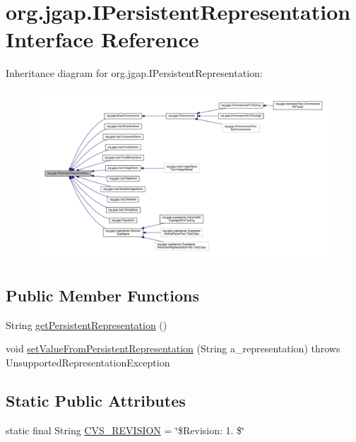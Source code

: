 \hypertarget{interfaceorg_1_1jgap_1_1_i_persistent_representation}{\section{org.\-jgap.\-I\-Persistent\-Representation Interface Reference}
\label{interfaceorg_1_1jgap_1_1_i_persistent_representation}
}


Inheritance diagram for org.\-jgap.\-I\-Persistent\-Representation\-:
\nopagebreak
\begin{figure}[H]
\begin{center}
\leavevmode
\includegraphics[width=350pt]{interfaceorg_1_1jgap_1_1_i_persistent_representation__inherit__graph}
\end{center}
\end{figure}
\subsection*{Public Member Functions}
\begin{DoxyCompactItemize}
\item 
String \hyperlink{interfaceorg_1_1jgap_1_1_i_persistent_representation_a07bf7dbaa8de08e268c9357a46e79dac}{get\-Persistent\-Representation} ()
\item 
void \hyperlink{interfaceorg_1_1jgap_1_1_i_persistent_representation_a94a345f1919c4840dd0b9eecf7afc6a3}{set\-Value\-From\-Persistent\-Representation} (String a\-\_\-representation)  throws Unsupported\-Representation\-Exception
\end{DoxyCompactItemize}
\subsection*{Static Public Attributes}
\begin{DoxyCompactItemize}
\item 
static final String \hyperlink{interfaceorg_1_1jgap_1_1_i_persistent_representation_ae48c5895f4af079337ffebe487b176f5}{C\-V\-S\-\_\-\-R\-E\-V\-I\-S\-I\-O\-N} = \char`\"{}\$Revision\-: 1. \$\char`\"{}
\end{DoxyCompactItemize}


